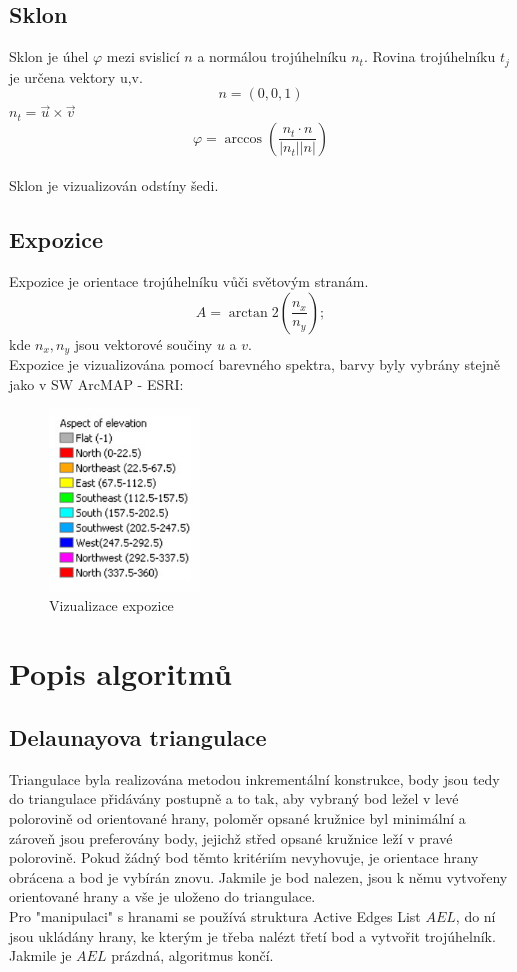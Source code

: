 \documentclass[a4paper, 12pt]{article}
\begin{document}
\subsection{Sklon}

Sklon je úhel $\varphi$ mezi svislicí $n$ a normálou trojúhelníku $n_t$. Rovina trojúhelníku $t_j$ je určena vektory u,v.\\

\noindent $$n = (0,0,1)$$
$n_t = \vec{u}\times \vec{v}$
$$\varphi =\arccos(\frac{n_t \cdot n}{|n_t| |n|})$$
\\
Sklon je vizualizován odstíny šedi.


\subsection{Expozice}
Expozice je orientace trojúhelníku vůči světovým stranám.\\
$$A = \arctan2(\frac{n_x}{n_y});$$ kde $n_x, n_y$ jsou vektorové součiny $u$ a $v$.\\

\noindent Expozice je vizualizována pomocí barevného spektra, barvy byly vybrány stejně jako v SW ArcMAP - ESRI:\\
\begin{figure}[h]
	\centering
	\includegraphics[width=4cm]{expozice.jpg}
	\caption{Vizualizace expozice}
\end{figure}


\clearpage
\section{Popis algoritmů}

\subsection{Delaunayova triangulace}
Triangulace byla realizována metodou inkrementální konstrukce, body jsou tedy do triangulace přidávány postupně a to tak, aby vybraný bod ležel v levé polorovině od orientované hrany, poloměr opsané kružnice byl minimální a zároveň jsou preferovány body, jejichž střed opsané kružnice leží v pravé polorovině. Pokud žádný bod těmto kritériím nevyhovuje, je orientace hrany obrácena a bod je vybírán znovu. Jakmile je bod nalezen, jsou k němu vytvořeny orientované hrany a vše je uloženo do triangulace.\\
Pro "manipulaci" s hranami se používá struktura Active Edges List $AEL$, do ní jsou ukládány hrany, ke kterým je třeba nalézt třetí bod a vytvořit trojúhelník. Jakmile je $AEL$ prázdná, algoritmus končí.
\end{document}
